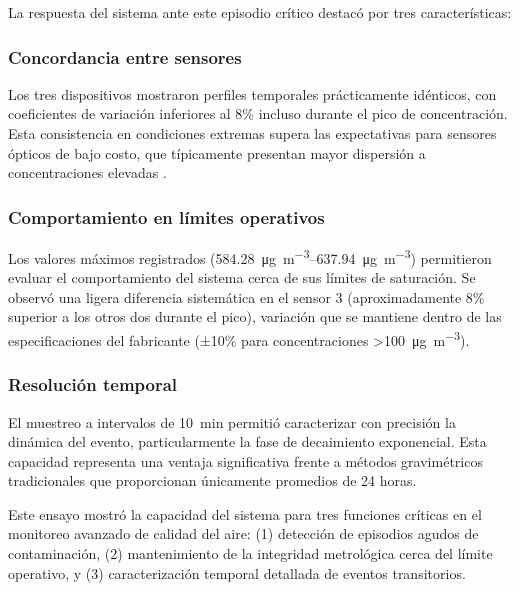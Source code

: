 La respuesta del sistema ante este episodio crítico destacó por tres características:

\subsubsection*{Concordancia entre sensores}
Los tres dispositivos mostraron perfiles temporales prácticamente idénticos, con coeficientes de variación inferiores al 8\% incluso durante el pico de concentración. Esta consistencia en condiciones extremas supera las expectativas para sensores ópticos de bajo costo, que típicamente presentan mayor dispersión a concentraciones elevadas \citep{Kuula2020}.

\subsubsection*{Comportamiento en límites operativos}
Los valores máximos registrados (\SIrange{584.28}{637.94}{\micro\gram\per\cubic\meter}) permitieron evaluar el comportamiento del sistema cerca de sus límites de saturación. Se observó una ligera diferencia sistemática en el sensor 3 (aproximadamente 8\% superior a los otros dos durante el pico), variación que se mantiene dentro de las especificaciones del fabricante (±10\% para concentraciones >\SI{100}{\micro\gram\per\cubic\meter}).

\subsubsection*{Resolución temporal}
El muestreo a intervalos de \SI{10}{\minute} permitió caracterizar con precisión la dinámica del evento, particularmente la fase de decaimiento exponencial. Esta capacidad representa una ventaja significativa frente a métodos gravimétricos tradicionales que proporcionan únicamente promedios de 24 horas.

Este ensayo mostró la capacidad del sistema para tres funciones críticas en el monitoreo avanzado de calidad del aire: (1) detección de episodios agudos de contaminación, (2) mantenimiento de la integridad metrológica cerca del límite operativo, y (3) caracterización temporal detallada de eventos transitorios.





